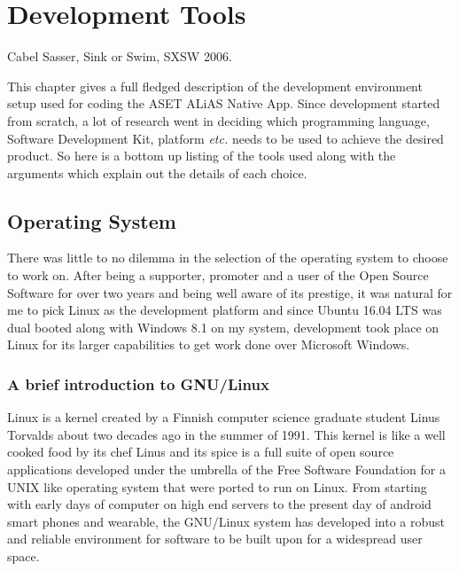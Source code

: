 \chapter{Development Tools}
\label{chap:devTools}
\begin{epigraphs}
%
      {Cabel Sasser, Sink or Swim, SXSW 2006}.
\end{epigraphs}
This chapter gives a full fledged description of the development environment setup used for coding the ASET ALiAS Native App. Since development started from scratch, a lot of research went in deciding which programming language, Software Development Kit, platform \emph{etc.} needs to be used to achieve the desired product. So here is a bottom up listing of the tools used along with the arguments which explain out the details of each choice.

\section {Operating System}
There was little to no dilemma in the selection of the operating system to choose to work on. After being a supporter, promoter and a user of the Open Source Software for over two years and being well aware of its prestige, it was natural for me to pick Linux as the development platform and since Ubuntu 16.04 LTS was dual booted along with Windows 8.1 on my system, development took place on Linux for its larger capabilities to get work done over Microsoft Windows. 

\subsection{A brief introduction to GNU/Linux}
Linux is a kernel created by a Finnish computer science graduate student Linus Torvalds about two decades ago in the summer of 1991. This kernel is like a well cooked food by its chef Linus and its spice is a full suite of open source applications developed under the umbrella of the Free Software Foundation for a UNIX like operating system that were ported to run on Linux. From starting with early days of computer on high end servers to the present day of android smart phones and wearable, the GNU/Linux system has developed into a robust and reliable environment for software to be built upon for a widespread user space. \bigskip

